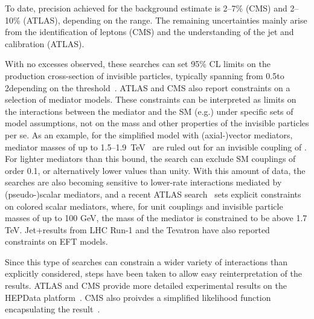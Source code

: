 To date, precision achieved for the background estimate is 2--7\% (CMS) and 2--10\% (ATLAS), depending on the \MET range.
The remaining uncertainties mainly arise from the identification of leptons (CMS) and the understanding of the jet and \MET calibration (ATLAS). 


With no excesses observed, these searches can set 95\% CL limits on the production cross-section of invisible particles, typically spanning from 0.5\pb to 2\fb depending on the \MET threshold~\cite{Aaboud:2017phn}.
ATLAS and CMS also report constraints on a selection of mediator models.
These constraints can be interpreted as limits on the interactions between the mediator and the SM (e.g.\gq) under specific sets of model assumptions, not on the mass and other properties of the invisible particles per se.
As an example, for the simplified model with (axial-)vector mediators, mediator masses of up to 1.5--1.9~TeV~\cite{Aaboud:2017phn,Sirunyan:2017jix} are ruled out for an invisible coupling of . For lighter mediators than this bound, the search can exclude SM couplings of order 0.1, or alternatively lower \gdm values than unity.
With this amount of data, the searches are also becoming sensitive to lower-rate interactions mediated by (pseudo-)scalar mediators, and a recent ATLAS search~\cite{Aaboud:2017phn} sets explicit constraints on colored scalar mediators, where, for unit couplings and invisible particle masses of up to 100 GeV, the mass of the mediator is constrained to be above 1.7 TeV. 
Jet+\MET results from LHC Run-1 and the Tevatron have also reported constraints on EFT models.  

Since this type of searches can constrain a wider variety of interactions than explicitly considered, steps have been taken to allow easy reinterpretation of the results. 
ATLAS and CMS provide more detailed experimental results on the HEPData platform~\cite{Maguire:2017ypu}.
CMS also proivdes a simplified likelihood function encapsulating the result~\cite{Collaboration:2242860,Sirunyan:2017jix}.


